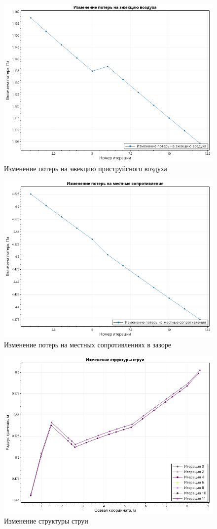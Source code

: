 \begin{figure}[H]
    \label{fig:EjectionLosses}
    \centering
    \includegraphics[width=13cm]{Figures/Hej.png}
    \caption{Изменение потерь на эжекцию приструйсного воздуха}
\end{figure}

\begin{figure}[H]
    \label{fig:LocalLosses}
    \centering
    \includegraphics[width=13cm]{Figures/Hl.png}
    \caption{Изменение потерь на местных сопротивлениях в зазоре}
\end{figure}

\begin{figure}[H]
    \label{fig:FluidStructure}
    \centering
    \includegraphics[width=13cm]{Figures/FluidStruct.png}
    \caption{Изменение структуры струи}
\end{figure}
